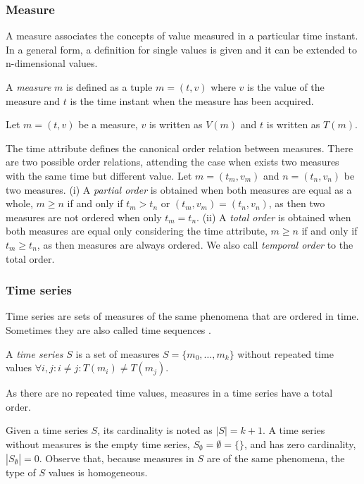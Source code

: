 \subsubsection{Measure}

A measure associates the concepts of value measured in a particular
time instant.  In a general form, a definition for single values is
given and it can be extended to n-dimensional values.

\begin{definition}
  A \emph{measure} $m$ is defined as a tuple $m=(t,v)$ where $v$ is the
  value of the measure and $t$ is the time instant when the measure
  has been acquired.
\end{definition}

Let $m = (t,v)$ be a measure, $v$ is written as $V(m)$ and $t$ is
written as $T(m)$.


The time attribute defines the canonical order relation between
measures. There are two possible order relations, attending the case
when exists two measures with the same time but different value. Let
$m = (t_m, v_m)$ and $n = (t_n, v_n)$ be two measures.  (i) A
\emph{partial order} is obtained when both measures are equal as a
whole, $m \geq n$ if and only if $t_m > t_n$ or $(t_m, v_m) = (t_n,
v_n)$, as then two measures are not ordered when only $t_m =
t_n$. (ii) A \emph{total order} is obtained when both measures are
equal only considering the time attribute, $m\geq n$ if and only if
$t_m\geq t_n$, as then measures are always ordered.  We also call
\emph{temporal order} to the total order.



\subsubsection{Time series}

Time series are sets of measures of the same phenomena that are
ordered in time.  Sometimes they are also called time sequences
\cite{last:hetland}.


\begin{definition}
  \label{def:model:timeseries}
  A \emph{time series} $S$ is a set of measures $S = \{m_0, \ldots,
  m_k\}$ without repeated time values $\forall i,j:i\neq j: T(m_i)\neq
  T(m_j)$.
\end{definition}

As there are no repeated time values, measures in a time series have a
total order.

Given a time series $S$, its cardinality is noted as $|S|=k+1$.  A
time series without measures is the empty time series,
$S_\emptyset=\emptyset=\{\}$, and has zero cardinality,
$|S_\emptyset|=0$.  Observe that, because measures in $S$ are of the
same phenomena, the type of $S$ values is homogeneous.



